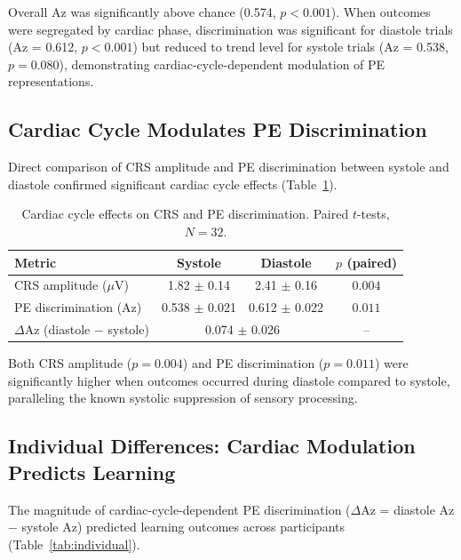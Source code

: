 \documentclass[11pt]{article}
\begin{document}
Overall Az was significantly above chance (0.574, $p < 0.001$). When outcomes were segregated by cardiac phase, discrimination was significant for diastole trials (Az = 0.612, $p < 0.001$) but reduced to trend level for systole trials (Az = 0.538, $p = 0.080$), demonstrating cardiac-cycle-dependent modulation of PE representations.

\subsection{Cardiac Cycle Modulates PE Discrimination}

Direct comparison of CRS amplitude and PE discrimination between systole and diastole confirmed significant cardiac cycle effects (Table~\ref{tab:cardiac_phase}).

\begin{table}[H]
\centering
\caption{Cardiac cycle effects on CRS and PE discrimination. Paired $t$-tests, $N = 32$.}
\label{tab:cardiac_phase}
\begin{tabular}{lccc}
\toprule
Metric & Systole & Diastole & $p$ (paired) \\
\midrule
CRS amplitude ($\mu$V) & 1.82 $\pm$ 0.14 & 2.41 $\pm$ 0.16 & $\mathbf{0.004}$ \\
PE discrimination (Az) & 0.538 $\pm$ 0.021 & 0.612 $\pm$ 0.022 & $\mathbf{0.011}$ \\
$\Delta$Az (diastole $-$ systole) & \multicolumn{2}{c}{0.074 $\pm$ 0.026} & -- \\
\bottomrule
\end{tabular}
\end{table}

Both CRS amplitude ($p = 0.004$) and PE discrimination ($p = 0.011$) were significantly higher when outcomes occurred during diastole compared to systole, paralleling the known systolic suppression of sensory processing.

\subsection{Individual Differences: Cardiac Modulation Predicts Learning}

The magnitude of cardiac-cycle-dependent PE discrimination ($\Delta$Az = diastole Az $-$ systole Az) predicted learning outcomes across participants (Table~\ref{tab:individual}).
\end{document}
